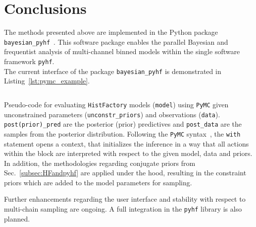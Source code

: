 \section{Conclusions}\label{sec:conclusions}

The methods presented above are implemented in the Python package \texttt{bayesian\_pyhf}~\cite{BayesianPyhf}. This software package enables the parallel Bayesian and frequentist analysis of multi-channel binned models within the single software framework \texttt{pyhf}.\\
The current interface of the package \texttt{bayesian\_pyhf} is demonstrated in Listing~\ref{lst:pymc_example}.

\begin{listing}
 \inputminted{python}{src/code/pymc_example.py}
 \caption{Pseudo-code for evaluating \texttt{HistFactory} models (\texttt{model}) using \texttt{PyMC} given unconstrained parameters (\texttt{unconstr\_priors}) and observations (\texttt{data}). \texttt{post(prior)\_pred} are the posterior (prior) predictives and \texttt{post\_data} are the samples from the posterior distribution. Following the \texttt{PyMC} syntax~\cite{PyMC}, the \texttt{with} statement opens a context, that initializes the inference in a way that all actions within the block are interpreted with respect to the given model, data and priors. In addition, the methodologies regarding conjugate priors from Sec.~\ref{subsec:HFandpyhf} are applied under the hood, resulting in the constraint priors which are added to the model parameters for sampling.}
 \label{lst:pymc_example}
\end{listing}

\noindent Further enhancements regarding the user interface and stability with respect to multi-chain sampling are ongoing. A full integration in the \texttt{pyhf} library is also planned.
